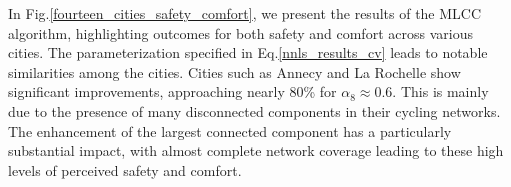 \documentclass[lettersize,journal]{IEEEtran}
\begin{document}
\renewcommand{\thetable}{\arabic{table}} 



  




 In Fig.\ref{fourteen_cities_safety_comfort}, we present the results of the MLCC algorithm, highlighting outcomes for both safety and comfort across various cities. The parameterization specified in Eq.\eqref{nnls_results_cv} leads to notable similarities among the cities. Cities such as Annecy and La Rochelle show significant improvements, approaching nearly 80\% for $\alpha_{8} \approx 0.6$. This is mainly due to the presence of many disconnected components in their cycling networks. The enhancement of the largest connected component has a particularly substantial impact, with almost complete network coverage leading to these high levels of perceived safety and comfort. 
\end{document}
